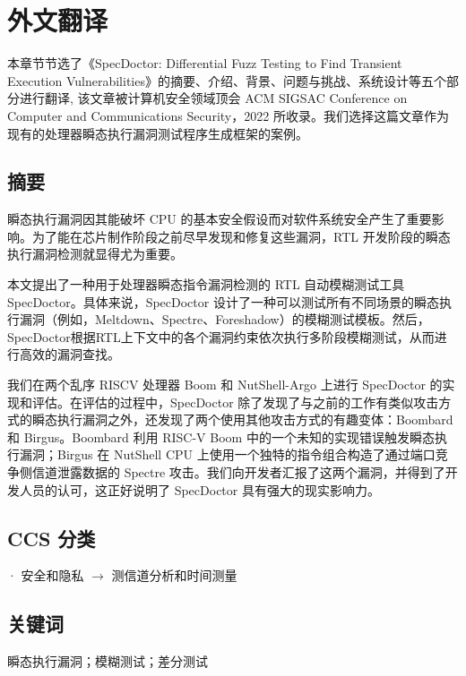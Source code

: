 \cleardoublepage

\newrefsection

\chapter{外文翻译}

本章节节选了《SpecDoctor: Differential Fuzz Testing to Find Transient Execution Vulnerabilities》的摘要、介绍、背景、问题与挑战、系统设计等五个部分进行翻译, 该文章被计算机安全领域顶会 ACM SIGSAC Conference on Computer and Communications Security，2022 所收录。我们选择这篇文章作为现有的处理器瞬态执行漏洞测试程序生成框架的案例。

\section*{摘要}

瞬态执行漏洞因其能破坏 CPU 的基本安全假设而对软件系统安全产生了重要影响。为了能在芯片制作阶段之前尽早发现和修复这些漏洞，RTL 开发阶段的瞬态执行漏洞检测就显得尤为重要。\par

本文提出了一种用于处理器瞬态指令漏洞检测的 RTL 自动模糊测试工具 SpecDoctor。具体来说，SpecDoctor 设计了一种可以测试所有不同场景的瞬态执行漏洞（例如，Meltdown、Spectre、Foreshadow）的模糊测试模板。然后，SpecDoctor根据RTL上下文中的各个漏洞约束依次执行多阶段模糊测试，从而进行高效的漏洞查找。\par

我们在两个乱序 RISCV 处理器 Boom 和 NutShell-Argo 上进行 SpecDoctor 的实现和评估。在评估的过程中，SpecDoctor 除了发现了与之前的工作有类似攻击方式的瞬态执行漏洞之外，还发现了两个使用其他攻击方式的有趣变体：Boombard 和 Birgus。Boombard 利用 RISC-V Boom 中的一个未知的实现错误触发瞬态执行漏洞；Birgus 在 NutShell CPU 上使用一个独特的指令组合构造了通过端口竞争侧信道泄露数据的 Spectre 攻击。我们向开发者汇报了这两个漏洞，并得到了开发人员的认可，这正好说明了 SpecDoctor 具有强大的现实影响力。

\section*{CCS 分类}
· 安全和隐私 $\longrightarrow$ 测信道分析和时间测量

\section*{关键词}
瞬态执行漏洞；模糊测试；差分测试

